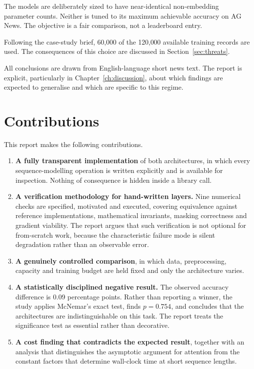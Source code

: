  The models are deliberately sized to have
near-identical non-embedding parameter counts. Neither is tuned to its maximum achievable accuracy
on AG News. The objective is a fair comparison, not a leaderboard entry.

 Following the case-study brief, 60{,}000 of
the 120{,}000 available training records are used. The consequences of this choice are discussed
in Section~\ref{sec:threats}.

 All conclusions are drawn from
English-language short news text. The report is explicit, particularly in
Chapter~\ref{ch:discussion}, about which findings are expected to generalise and which are
specific to this regime.

\section{Contributions}

This report makes the following contributions.

\begin{enumerate}
\item \textbf{A fully transparent implementation} of both architectures, in which every
      sequence-modelling operation is written explicitly and is available for inspection. Nothing
      of consequence is hidden inside a library call.

\item \textbf{A verification methodology for hand-written layers.} Nine numerical checks are
      specified, motivated and executed, covering equivalence against reference implementations,
      mathematical invariants, masking correctness and gradient viability. The report argues that
      such verification is not optional for from-scratch work, because the characteristic failure
      mode is silent degradation rather than an observable error.

\item \textbf{A genuinely controlled comparison}, in which data, preprocessing, capacity and
      training budget are held fixed and only the architecture varies.

\item \textbf{A statistically disciplined negative result.} The observed accuracy difference is
      0.09 percentage points. Rather than reporting a winner, the study applies McNemar's exact
      test, finds $p = 0.754$, and concludes that the architectures are indistinguishable on this
      task. The report treats the significance test as essential rather than decorative.

\item \textbf{A cost finding that contradicts the expected result}, together with an analysis that
      distinguishes the asymptotic argument for attention from the constant factors that determine
      wall-clock time at short sequence lengths.
\end{enumerate}

